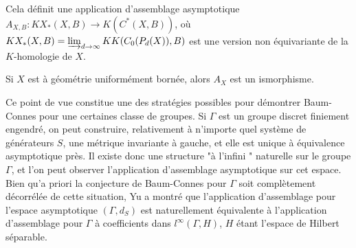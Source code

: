 Cela définit une application d'assemblage asymptotique $A_{X,B} : KX_*(X,B)\rightarrow K(C^*(X,B))$, où $KX_*(X,B)=\varinjlim_{d\rightarrow \infty} KK(C_0(P_d(X)),B)$ est une version non équivariante de la $K$-homologie de $X$.
\begin{conj} Si $X$ est à géométrie uniformément bornée, alors $A_X$ est un ismorphisme.
\end{conj}

Ce point de vue constitue une des stratégies possibles pour démontrer Baum-Connes pour une certaines classe de groupes. Si $\Gamma$ est un groupe discret finiement engendré, on peut construire, relativement à n'importe quel système de générateurs $S$, une métrique invariante à gauche, et elle est unique à équivalence asymptotique près. Il existe donc une structure "à l'infini " naturelle sur le groupe $\Gamma$, et l'on peut observer l'application d'assemblage asymptotique sur cet espace. Bien qu'a priori la conjecture de Baum-Connes pour $\Gamma$ soit complètement décorrélée de cette situation, Yu a montré que l'application d'assemblage pour l'espace asymptotique $(\Gamma, d_S)$ est naturellement équivalente à l'application d'assemblage pour $\Gamma$ à coefficients dans $l^\infty(\Gamma, H)$, $H$ étant l'espace de Hilbert séparable.















